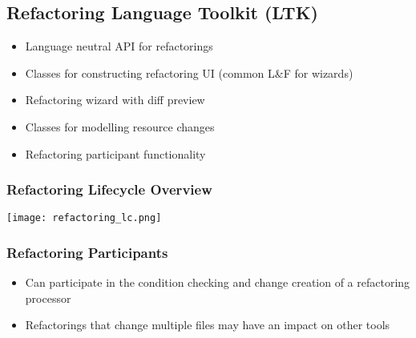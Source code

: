 \subsection{Refactoring Language Toolkit (LTK)}
\begin{itemize}
    \item Language neutral API for refactorings
    \item Classes for constructing refactoring UI (common L\&F for wizards)
    \item Refactoring wizard with diff preview
    \item Classes for modelling resource changes
    \item Refactoring participant functionality
\end{itemize}
\subsubsection{Refactoring Lifecycle Overview}
\texttt{[image: refactoring\_lc.png]}

\subsubsection{Refactoring Participants}
\begin{itemize}
    \item Can participate in the condition checking and change creation of a refactoring processor
    \item Refactorings that change multiple files may have an impact on other tools
\end{itemize}

